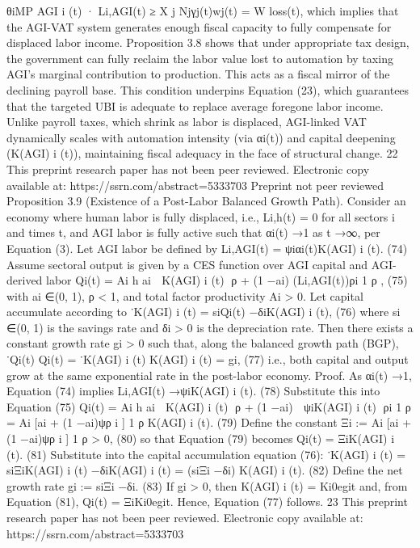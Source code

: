 θiMP AGI
i
(t) · Li,AGI(t) ≥
X
j
Njγj(t)wj(t) = W loss(t),
which implies that the AGI-VAT system generates enough fiscal capacity to fully compensate
for displaced labor income.
Proposition 3.8 shows that under appropriate tax design, the government can fully reclaim
the labor value lost to automation by taxing AGI’s marginal contribution to production. This
acts as a fiscal mirror of the declining payroll base. This condition underpins Equation (23),
which guarantees that the targeted UBI is adequate to replace average foregone labor income.
Unlike payroll taxes, which shrink as labor is displaced, AGI-linked VAT dynamically scales
with automation intensity (via αi(t)) and capital deepening (K(AGI)
i
(t)), maintaining fiscal
adequacy in the face of structural change.
22
This preprint research paper has not been peer reviewed. Electronic copy available at: https://ssrn.com/abstract=5333703
Preprint not peer reviewed
Proposition 3.9 (Existence of a Post-Labor Balanced Growth Path). Consider an economy
where human labor is fully displaced, i.e., Li,h(t) = 0 for all sectors i and times t, and AGI
labor is fully active such that αi(t) →1 as t →∞, per Equation (3). Let AGI labor be
defined by
Li,AGI(t) = ψiαi(t)K(AGI)
i
(t).
(74)
Assume sectoral output is given by a CES function over AGI capital and AGI-derived labor
Qi(t) = Ai
h
ai

K(AGI)
i
(t)
ρ
+ (1 −ai) (Li,AGI(t))ρi 1
ρ ,
(75)
with ai ∈(0, 1), ρ < 1, and total factor productivity Ai > 0. Let capital accumulate according
to
˙K(AGI)
i
(t) = siQi(t) −δiK(AGI)
i
(t),
(76)
where si ∈(0, 1) is the savings rate and δi > 0 is the depreciation rate.
Then there exists a constant growth rate gi > 0 such that, along the balanced growth path
(BGP),
˙Qi(t)
Qi(t) =
˙K(AGI)
i
(t)
K(AGI)
i
(t)
= gi,
(77)
i.e., both capital and output grow at the same exponential rate in the post-labor economy.
Proof. As αi(t) →1, Equation (74) implies
Li,AGI(t) →ψiK(AGI)
i
(t).
(78)
Substitute this into Equation (75)
Qi(t) = Ai
h
ai

K(AGI)
i
(t)
ρ
+ (1 −ai)

ψiK(AGI)
i
(t)
ρi 1
ρ
= Ai [ai + (1 −ai)ψρ
i ]
1
ρ K(AGI)
i
(t).
(79)
Define the constant
Ξi := Ai [ai + (1 −ai)ψρ
i ]
1
ρ > 0,
(80)
so that Equation (79) becomes
Qi(t) = ΞiK(AGI)
i
(t).
(81)
Substitute into the capital accumulation equation (76):
˙K(AGI)
i
(t) = siΞiK(AGI)
i
(t) −δiK(AGI)
i
(t)
= (siΞi −δi) K(AGI)
i
(t).
(82)
Define the net growth rate
gi := siΞi −δi.
(83)
If gi > 0, then K(AGI)
i
(t) = Ki0egit and, from Equation (81), Qi(t) = ΞiKi0egit. Hence,
Equation (77) follows.
23
This preprint research paper has not been peer reviewed. Electronic copy available at: https://ssrn.com/abstract=5333703
